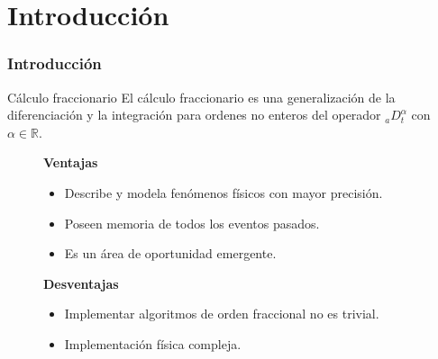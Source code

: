 \documentclass[10pt]{beamer}
\begin{document}
	\section{Introducción}
	\begin{frame}
		\frametitle{Introducción}
		\begin{block}{Cálculo fraccionario}
		\justifying
		El cálculo fraccionario es una generalización de la  diferenciación y la integración para ordenes no enteros del operador $_{a}D_{t}^{\alpha}$ con $\alpha \in \mathbb{R}$. \cite{Petras2011}
			\begin{figure}[!h]
				\begin{minipage}[c]{0.48\textwidth}
					\textbf{Ventajas}
					\begin{itemize}
								\justifying
								\item Describe y modela fenómenos físicos con mayor precisión.
								\item Poseen memoria de todos los eventos pasados.
								\item Es un área de oportunidad emergente.
					\end{itemize}
				\end{minipage} \hfill \begin{minipage}[c]{0.48\textwidth}
					\textbf{Desventajas}
					\begin{itemize}
								\justifying
								\item Implementar algoritmos de orden fraccional no es trivial.
								\item Implementación física compleja.
					\end{itemize}
				\end{minipage}
			\end{figure}		
		\end{block}
	\end{frame}
	
\end{document}
